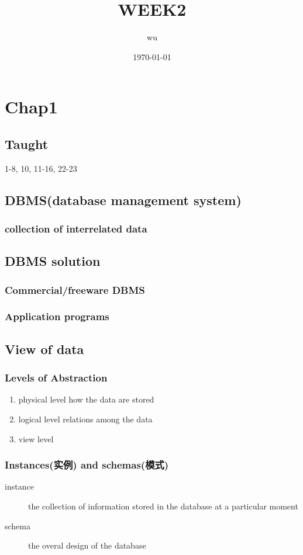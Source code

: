 \documentclass[11pt]{article}
\author{wu}
\date{\today}
\title{ WEEK2}
\begin{document}
\maketitle
\tableofcontents

\section{Chap1}
\label{sec-1}
\subsection{Taught}
\label{sec-1-1}
1-8, 10, 11-16, 22-23
\subsection{DBMS(database management system)}
\label{sec-1-2}
\subsubsection{collection of interrelated data}
\label{sec-1-2-1}
\subsection{DBMS solution}
\label{sec-1-3}
\subsubsection{Commercial/freeware DBMS}
\label{sec-1-3-1}
\subsubsection{Application programs}
\label{sec-1-3-2}
\subsection{View of data}
\label{sec-1-4}
\subsubsection{Levels of Abstraction}
\label{sec-1-4-1}
\begin{enumerate}
\item physical level
\label{sec-1-4-1-1}
how the data are stored
\item logical level
\label{sec-1-4-1-2}
relations among the data
\item view level
\label{sec-1-4-1-3}
\end{enumerate}
\subsubsection{Instances(实例) and schemas(模式)}
\label{sec-1-4-2}
\begin{description}
\item[{instance}] the collection of information stored in the
database at a particular moment
\item[{schema}] the overal design of the database
\end{description}
\end{document}
